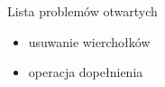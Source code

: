 \documentclass[polish]{beamer}
\begin{document}
\begin{frame}{Lista problemów otwartych}
    \begin{itemize}
        \item usuwanie wierchołków
        \item operacja dopełnienia
    \end{itemize}
\end{frame}




\end{document}
